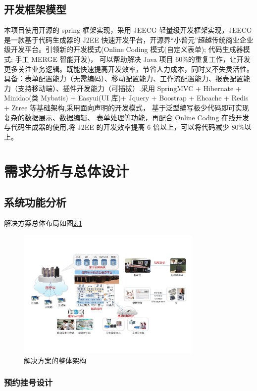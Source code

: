 \documentclass[doctor,secret]{thuthesis}
\begin{document}
\section{开发框架模型}
\label{sec:org1c47e72}
本项目使用开源的 spring 框架实现，采用 JEECG 轻量级开发框架实现，JEECG 是一款基于代码生成器的 J2EE 快速开发平台，开源界“小普元”超越传统商业企业级开发平台。引领新的开发模式(Online Coding 模式(自定义表单); 代码生成器模式; 手工 MERGE 智能开发)， 可以帮助解决 Java 项目 60\%的重复工作，让开发更多关注业务逻辑。既能快速提高开发效率，节省人力成本，同时又不失灵活性。具备：表单配置能力（无需编码）、移动配置能力、工作流配置能力、报表配置能力（支持移动端）、插件开发能力（可插拔）.采用 SpringMVC + Hibernate + Minidao(类 Mybatis) + Easyui(UI 库)+ Jquery + Boostrap + Ehcache + Redis + Ztree 等基础架构,采用面向声明的开发模式， 基于泛型编写极少代码即可实现复杂的数据展示、数据编辑、 表单处理等功能，再配合 Online Coding 在线开发与代码生成器的使用,将 J2EE 的开发效率提高 6 倍以上，可以将代码减少 80\%以上。
\chapter{需求分析与总体设计}
\label{sec:orge614e56}
\section{系统功能分析}
\label{sec:org9881e58}
解决方案总体布局如图\ref{fig:generalscheme}

\begin{figure}[htbp]
\centering
\includegraphics[width=0.8\textwidth]{figures/general-framework.pdf}
\caption{解决方案的整体架构 \label{fig:generalscheme}}
\end{figure} 

\subsection{预约挂号设计}
\label{sec:orgb71e788}
\end{document}
